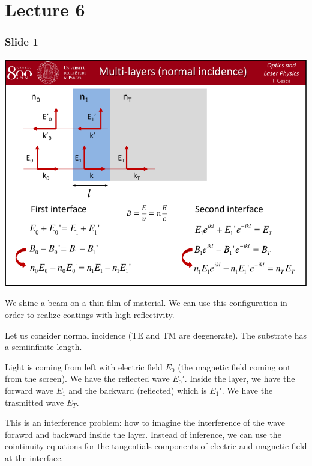 \documentclass[../main/main.tex]{subfiles}
\begin{document}
\pagestyle{plain}

\section{Lecture 6}


\subsubsection*{Slide 1}

\begin{minipage}[]{0.5\linewidth}
\centering
\includegraphics[page=1,width=1\textwidth]{../lessons/pdf_file/06_lecture.pdf}
\end{minipage}
\hspace{0.3cm}\vspace{0.3cm}
\begin{minipage}[c]{0.47\linewidth}

We shine a beam on a thin film of material. We can use this configuration in order to realize coatings with high reflectivity.

Let us consider normal incidence (TE and TM are degenerate). The substrate has a semiinfinite length.

Light is coming from left with electric field \( E_0 \) (the magnetic field coming out from the screen). We have the reflected wave \( E_0' \).
Inside the layer, we have the forward wave \( E_1 \) and the backward (reflected) which is \( E_1' \). We have the trasmitted wave \( E_T \).

This is an interference problem: how to imagine the interference of the wave forawrd and backward inside the layer.
Instead of inference, we can use the cointinuity equations for the tangentials components of electric and magnetic field at the interface.

\end{minipage}
\end{document}

